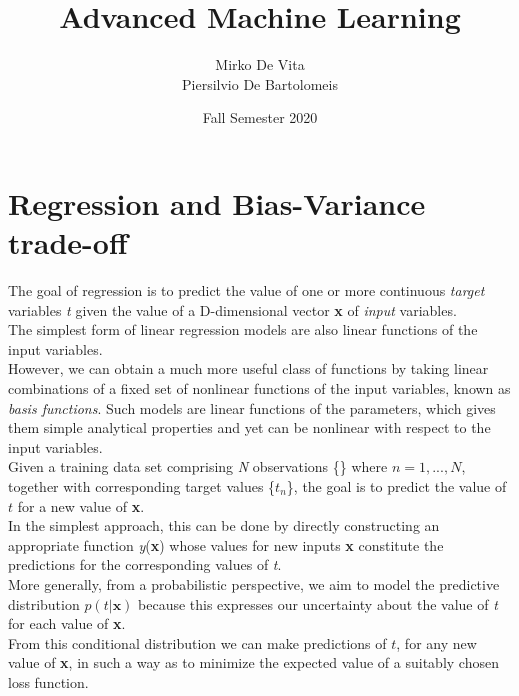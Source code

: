 \documentclass{article}
\title{Advanced Machine Learning}
\author{Mirko De Vita \\ Piersilvio De Bartolomeis}
\date{Fall Semester 2020}
\begin{document}
\maketitle

\section{Regression and Bias-Variance trade-off}

The goal of regression is to predict the value of one or more continuous \textit{target} variables \textit{t} given the value of a D-dimensional vector \textbf{x} of \textit{input} variables.
\\The simplest form of linear regression models are also linear functions of the input variables.
\\However, we can obtain a much more useful class of functions by taking linear combinations of a fixed set of nonlinear functions of the input variables, known as \textit{basis functions}. Such models are linear functions of the parameters, which gives them simple analytical properties and yet can be nonlinear with respect to the input variables.
\\Given a training data set comprising \textit{N} observations \{\} where $n = 1,...,N$, together with corresponding target values \{$t_n$\}, the goal is to predict the value of $t$ for a new value of \textbf{x}.
\\In the simplest approach, this can be done by directly constructing an appropriate function \textit{y}(\textbf{x}) whose values for new inputs \textbf{x} constitute the predictions for the corresponding values of \textit{t}.
\\More generally, from a probabilistic perspective, we aim to model the predictive distribution $p(t|\bm{x})$ because this expresses our uncertainty about the value of \textit{t} for each value of \textbf{x}.
\\From this conditional distribution we can make predictions of $t$, for any new value of \textbf{x}, in such a way as to minimize the expected value of a suitably chosen loss function.
\end{document}
